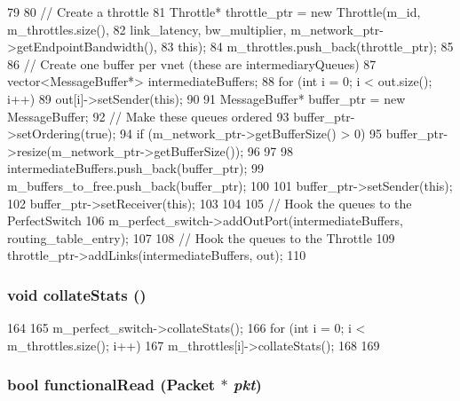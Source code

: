 \begin{DoxyCode}
79 {
80     // Create a throttle
81     Throttle* throttle_ptr = new Throttle(m_id, m_throttles.size(),
82             link_latency, bw_multiplier, m_network_ptr->getEndpointBandwidth(),
83             this);
84     m_throttles.push_back(throttle_ptr);
85 
86     // Create one buffer per vnet (these are intermediaryQueues)
87     vector<MessageBuffer*> intermediateBuffers;
88     for (int i = 0; i < out.size(); i++) {
89         out[i]->setSender(this);
90 
91         MessageBuffer* buffer_ptr = new MessageBuffer;
92         // Make these queues ordered
93         buffer_ptr->setOrdering(true);
94         if (m_network_ptr->getBufferSize() > 0) {
95             buffer_ptr->resize(m_network_ptr->getBufferSize());
96         }
97 
98         intermediateBuffers.push_back(buffer_ptr);
99         m_buffers_to_free.push_back(buffer_ptr);
100 
101         buffer_ptr->setSender(this);
102         buffer_ptr->setReceiver(this);
103     }
104 
105     // Hook the queues to the PerfectSwitch
106     m_perfect_switch->addOutPort(intermediateBuffers, routing_table_entry);
107 
108     // Hook the queues to the Throttle
109     throttle_ptr->addLinks(intermediateBuffers, out);
110 }
\end{DoxyCode}
\hypertarget{classSwitch_a208669cbc0bb1d52565956ca8c690c55}{
\subsubsection[{collateStats}]{\setlength{\rightskip}{0pt plus 5cm}void collateStats ()}}
\label{classSwitch_a208669cbc0bb1d52565956ca8c690c55}



\begin{DoxyCode}
164 {
165     m_perfect_switch->collateStats();
166     for (int i = 0; i < m_throttles.size(); i++) {
167         m_throttles[i]->collateStats();
168     }
169 }
\end{DoxyCode}
\hypertarget{classSwitch_a6db56c593ee28a561c47e75a859300dd}{
\subsubsection[{functionalRead}]{\setlength{\rightskip}{0pt plus 5cm}bool functionalRead ({\bf Packet} $\ast$ {\em pkt})}}
\label{classSwitch_a6db56c593ee28a561c47e75a859300dd}



